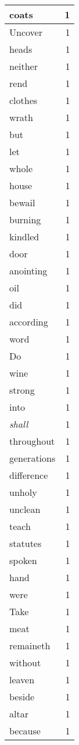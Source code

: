 \begin{center}
\begin{longtable}{l|r}
coats & 1 \\ \hline
Uncover & 1 \\ \hline
heads & 1 \\ \hline
neither & 1 \\ \hline
rend & 1 \\ \hline
clothes & 1 \\ \hline
wrath & 1 \\ \hline
but & 1 \\ \hline
let & 1 \\ \hline
whole & 1 \\ \hline
house & 1 \\ \hline
bewail & 1 \\ \hline
burning & 1 \\ \hline
kindled & 1 \\ \hline
door & 1 \\ \hline
anointing & 1 \\ \hline
oil & 1 \\ \hline
did & 1 \\ \hline
according & 1 \\ \hline
word & 1 \\ \hline
Do & 1 \\ \hline
wine & 1 \\ \hline
strong & 1 \\ \hline
into & 1 \\ \hline
\emph{shall} & 1 \\ \hline
throughout & 1 \\ \hline
generations & 1 \\ \hline
difference & 1 \\ \hline
unholy & 1 \\ \hline
unclean & 1 \\ \hline
teach & 1 \\ \hline
statutes & 1 \\ \hline
spoken & 1 \\ \hline
hand & 1 \\ \hline
were & 1 \\ \hline
Take & 1 \\ \hline
meat & 1 \\ \hline
remaineth & 1 \\ \hline
without & 1 \\ \hline
leaven & 1 \\ \hline
beside & 1 \\ \hline
altar & 1 \\ \hline
because & 1 \\ \hline

\end{longtable}
\end{center}
